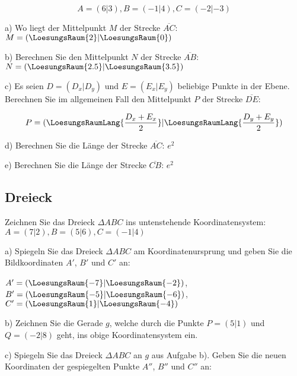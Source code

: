 $$A=(6|3), B=(-1|4), C=(-2|-3)$$


a) Wo liegt der Mittelpunkt $M$ der Strecke $\overline{AC}$: $M=(\LoesungsRaum{2}|\LoesungsRaum{0})$


b) Berechnen Sie den Mittelpunkt $N$ der Strecke $\overline{AB}$: $N=(\LoesungsRaum{2.5}|\LoesungsRaum{3.5})$


c) Es seien $D=(D_x|D_y)$ und $E=(E_x|E_y)$ beliebige Punkte in
der Ebene. Berechnen Sie im allgemeinen Fall den Mittelpunkt $P$ der Strecke $\overline{DE}$:


$$P = (\LoesungsRaumLang{\frac{D_x+E_x}2}|\LoesungsRaumLang{\frac{D_y+E_y}2})$$

d) Berechnen Sie die Länge der Strecke $\overline{AC}$: $e^2$


e) Berechnen Sie die Länge der Strecke $\overline{CB}$: $e^2$
\newpage%
\subsection{Dreieck}
Zeichnen Sie das Dreieck $\Delta{}ABC$ ins untenstehende
Koordinatensystem:\\
$A=(7|2), B=(5|6), C=(-1|4)$


a) Spiegeln Sie das Dreieck $\Delta ABC$ am Koordinatenursprung und
geben Sie die Bildkoordinaten $A'$, $B'$ und $C'$ an:

$A' = (\LoesungsRaum{-7}|\LoesungsRaum{-2})$, 
$B' = (\LoesungsRaum{-5}|\LoesungsRaum{-6})$,\\
$C' = (\LoesungsRaum{1}|\LoesungsRaum{-4})$

b) Zeichnen Sie die Gerade $g$, welche durch die Punkte $P=(5|1)$ und
$Q=(-2|8)$ geht, ins obige Koordinatensystem ein.

c) Spiegeln Sie das Dreieck $\Delta ABC$ an $g$ aus Aufgabe b). Geben
Sie die neuen Koordinaten der gespiegelten Punkte $A''$, $B''$ und
$C''$ an:

